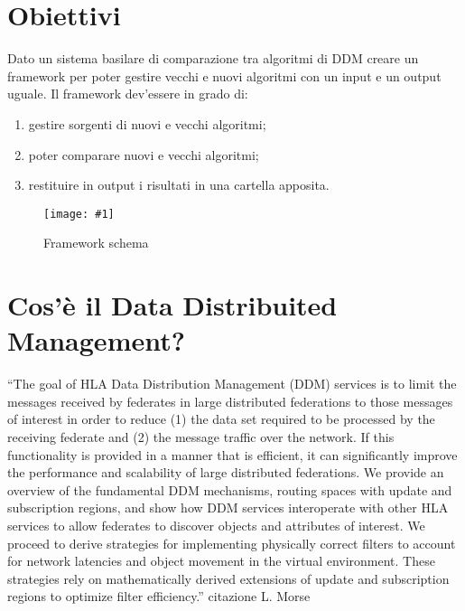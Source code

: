\documentclass[a4paper,11pt]{report}
\newcommand{\customfigure}[3]{
  \begin{figure}[ht]
    \centering
    \texttt{[image: \#1]}
    \caption{#2}
    \label{fig:#3}
  \end{figure}
}
\begin{document}
\begin{frontespizio}
\end{frontespizio}

\tableofcontents

\chapter{Obiettivi}

Dato un sistema basilare di comparazione tra algoritmi di DDM creare un framework
per poter gestire vecchi e nuovi algoritmi con un input e un output uguale.
Il framework dev'essere in grado di:
\begin{enumerate}
 \item gestire sorgenti di nuovi e vecchi algoritmi;
 \item poter comparare nuovi e vecchi algoritmi;
 \item restituire in output i risultati in una cartella apposita.
\end{enumerate}

\customfigure{./immagini/obiettivi.png}{Framework schema}{obiettivi}

\chapter{Cos'\`e il Data Distribuited Management?}

``The goal of HLA Data Distribution Management (DDM) services is to limit 
the messages received by federates in large distributed federations to 
those messages of interest in order to reduce (1) the data set required 
to be processed by the receiving federate and (2) the message traffic 
over the network. If this functionality is provided in a manner that 
is efficient, it can significantly improve the performance and scalability 
of large distributed federations. We provide an overview of the fundamental 
DDM mechanisms, routing spaces with update and subscription regions, 
and show how DDM services interoperate with other HLA services to allow 
federates to discover objects and attributes of interest. We proceed 
to derive strategies for implementing physically correct filters to account 
for network latencies and object movement in the virtual environment. 
These strategies rely on mathematically derived extensions of update and 
subscription regions to optimize filter efficiency.'' citazione L. Morse ~\cite{Morse97datadistribution}
\end{document}
